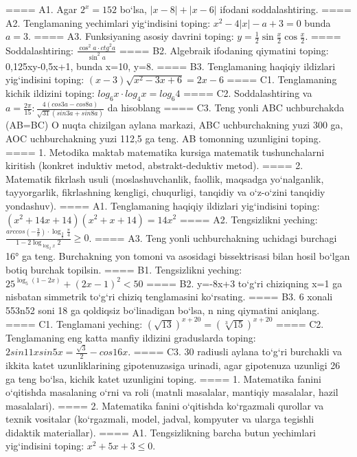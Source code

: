 ====
A1. Agar \(2^{x} = 152\) bo‘lsa, \(|x - 8| + |x - 6|\) ifodani soddalashtiring.
====
A2. Tenglamaning yechimlari yig‘indisini toping: \(x^2 - 4|x| - a + 3 = 0\) bunda \(a = 3\).
====
A3. Funksiyaning asosiy davrini toping: \(y = \frac{1}{2}\sin{\frac{x}{2}\cos\frac{x}{2}}\).
====
Soddalashtiring: \(\frac{\cos^{2}a \cdot {ctg}^{2}a}{\sin^{2}a}\)
====
B2. Algebraik ifodaning qiymatini toping: 0,125xy-0,5x+1, bunda x=10, y=8.
====
B3. Tenglamaning haqiqiy ildizlari yig‘indisini toping: \((x-3) \sqrt{x^{2} - 3x + 6} = 2x - 6\)
====
C1. Tenglamaning kichik ildizini toping: \(log_{6}x \cdot log_{4}x = log_{6}4\)
====
C2. Soddalashtiring va \(a = \frac{2\pi}{15}:\frac{4 (cos3a - cos8a) }{\sqrt{31} (sin3a + sin8a) }\) da hisoblang
====
C3. Teng yonli ABC uchburchakda (AB=BC) O nuqta chizilgan aylana markazi, ABC uchburchakning yuzi 300 ga, AOC uchburchakning yuzi 112,5 ga teng. AB tomonning uzunligini toping.
====
1. Metodika maktab matematika kursiga matematik tushunchalarni kiritish (konkret induktiv metod, abstrakt-deduktiv metod).
====
2. Matematik fikrlash usuli (moslashuvchanlik, faollik, maqsadga yo‘nalganlik, tayyorgarlik, fikrlashning kengligi, chuqurligi, tanqidiy va o‘z-o‘zini tanqidiy yondashuv).
====
A1. Tenglamaning haqiqiy ildizlari yig‘indisini toping: \((x^2 + 14x + 14) (x^2 + x + 14) = 14x^2\)
====
A2. Tengsizlikni yeching: \(\frac{arccos (- \frac{3}{\pi}) \cdot \log_{\frac{3}{\pi}}\frac{\pi}{4}}{1 - 2\log_{\log_{2}x}2} \geq 0\).
====
A3. Teng yonli uchburchakning uchidagi burchagi 16° ga teng. Burchakning yon tomoni va asosidagi bissektrisasi bilan hosil bo‘lgan botiq burchak topilsin.
====
B1. Tengsizlikni yeching: \(25^{\log_{5}{ (1 - 2x) }} + { (2x - 1) }^{2} < 50\)
====
B2. y=-8x+3 to‘g‘ri chiziqning x=1 ga nisbatan simmetrik to‘g‘ri chiziq tenglamasini ko‘rsating.
====
B3. 6 xonali 553n52 soni 18 ga qoldiqsiz bo‘linadigan bo‘lsa, n ning qiymatini aniqlang.
====
C1. Tenglamani yeching: \((\sqrt{13}) ^{x + 20} = (\sqrt[3]{15}) ^{x + 20}\)
====
C2. Tenglamaning eng katta manfiy ildizini graduslarda toping: \(2sin11xsin5x = \frac{\sqrt{3}}{2} - cos16x\).
====
C3. 30 radiusli aylana to‘g‘ri burchakli va ikkita katet uzunliklarining gipotenuzasiga urinadi, agar gipotenuza uzunligi 26 ga teng bo‘lsa, kichik katet uzunligini toping.
====
1. Matematika fanini o‘qitishda masalaning o‘rni va roli (matnli masalalar, mantiqiy masalalar, hazil masalalari).
====
2. Matematika fanini o‘qitishda ko‘rgazmali qurollar va texnik vositalar (ko‘rgazmali, model, jadval, kompyuter va ularga tegishli didaktik materiallar).
====
A1. Tengsizlikning barcha butun yechimlari yig‘indisini toping: \(x^2 + 5x + 3 \leq 0\).
